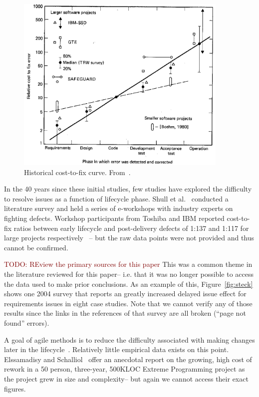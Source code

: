 \documentclass[smallcondensed]{svjour3}
\newcommand{\todo}[1]{\textcolor{Maroon}{TODO: #1}}
\newcommand{\fig}[1]{Figure~\ref{fig:#1}}
\begin{document}
\begin{figure}[!b]
\begin{center}\includegraphics[width=4in]{img/boehm_cost-to-fix.png}\end{center}
 \caption{Historical cost-to-fix curve. From~\cite{Boehm81}.}\label{fig:cost-to-fix}
 \end{figure}
 
In the 40 years since these initial studies, few studies have explored the difficulty to resolve issues
as a function of lifecycle phase. 
Shull et al.~\cite{Shull02} conducted a literature survey and held a series of e-workshops with industry experts on fighting defects. Workshop participants from Toshiba and IBM reported cost-to-fix ratios between early lifecycle and post-delivery defects of 1:137 and 1:117 for large projects respectively~\cite{Shull02} -- but the raw data points were not provided and thus cannot be confirmed. 

\todo{REview the primary sources for this paper}
This was a common theme in the literature reviewed for this paper-- i.e.  that  it was no longer possible to access
the data used to make prior conclusions.
As an example of this, \fig{steck} shows one 2004 survey that reports an 
greatly increased delayed issue  effect for 
requirements issues in eight case studies. Note that we cannot verify
any of those results since the links in the references of
that  survey are all broken (``page not found'' errors).


A goal of agile methods 
is to reduce the difficulty associated with making changes later in the lifecycle~\cite{beck00}. Relatively little empirical data exists on this point.
Elssamadisy and Schalliol~\cite{Elssamadisy02} offer an anecdotal report on the growing, high cost of rework in a 50 person, three-year, 500KLOC Extreme Programming project as the project grew in size and complexity-- but again we cannot access their 
exact figures.
\end{document}
